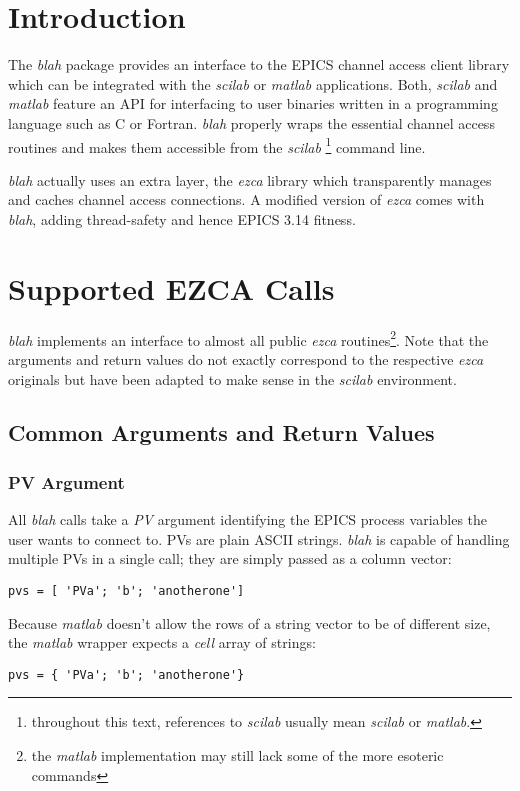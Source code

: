 \documentclass{article}
\newcommand{\sca}{{\em blah}}
\newcommand{\scilab}{{\em scilab}}
\newcommand{\matlab}{{\em matlab}}
\newcommand{\ezca}{{\em ezca}}
\begin{document}
\section{Introduction}
The \sca{} package provides an interface to the
EPICS channel access client library which can be
integrated with the \scilab{} or \matlab{} applications.
Both, \scilab{} and \matlab{} feature an API for interfacing
to user binaries written in a programming language such
as C or Fortran. \sca{} properly wraps the essential
channel access routines and makes them accessible
from the \scilab%
\footnote{throughout this text, references to \scilab{}
usually mean \scilab{} or \matlab.}
command line.

\sca{} actually uses an extra layer, the \ezca{} library
which transparently manages and caches channel access 
connections. A modified version of \ezca{} comes with
\sca, adding thread-safety and hence EPICS 3.14 fitness.

\section{Supported EZCA Calls}
\sca{} implements an interface to almost all public
\ezca{} routines\footnote{%
the \matlab{} implementation may still lack some of the
more esoteric commands}. Note that the arguments and
return values do not exactly correspond to the respective
\ezca{} originals but have been adapted to make sense
in the  \scilab{} environment.

\subsection{Common Arguments and Return Values}
\subsubsection{PV Argument}
All \sca{} calls take a {\em PV} argument identifying
the EPICS process variables the user wants to connect to.
PVs are plain ASCII strings. \sca{} is capable of handling
multiple PVs in a single call; they are simply passed as a
column vector:
\begin{verbatim}
pvs = [ 'PVa'; 'b'; 'anotherone']
\end{verbatim}
Because \matlab{} doesn't allow the rows of
a string vector to be of different size, the \matlab{}
wrapper expects a {\em cell} array of strings:
\begin{verbatim}
pvs = { 'PVa'; 'b'; 'anotherone'}
\end{verbatim}
\end{document}
